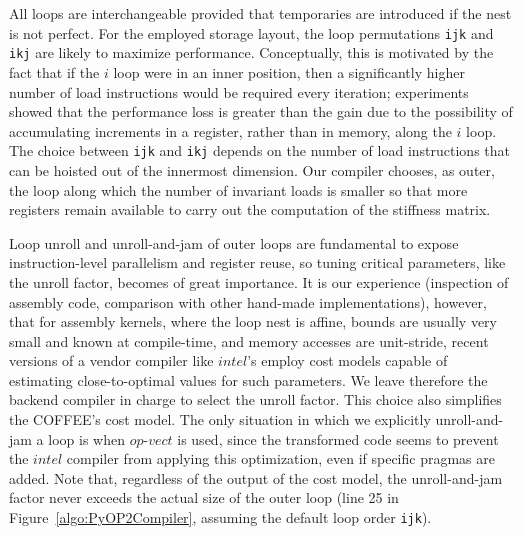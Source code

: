 \documentclass[conference]{IEEEtran}
\begin{document}
All loops are interchangeable provided that temporaries are introduced if the nest is not perfect. For the employed storage layout, the loop permutations \texttt{ijk} and \texttt{ikj} are likely to maximize performance. Conceptually, this is motivated by the fact that if the $i$ loop were in an inner position, then a significantly higher number of load instructions would be required every iteration; experiments showed that the performance loss is greater than the gain due to the possibility of accumulating increments in a register, rather than in memory, along the $i$ loop. The choice between \texttt{ijk} and \texttt{ikj} depends on the number of load instructions that can be hoisted out of the innermost dimension. Our compiler chooses, as outer, the loop along which the number of invariant loads is smaller so that more registers remain available to carry out the computation of the stiffness matrix.

Loop unroll and unroll-and-jam of outer loops are fundamental to expose instruction-level parallelism and register reuse, so tuning critical parameters, like the unroll factor, becomes of great importance. It is our experience (inspection of assembly code, comparison with other hand-made implementations), however, that for assembly kernels, where the loop nest is affine, bounds are usually very small and known at compile-time, and memory accesses are unit-stride, recent versions of a vendor compiler like $intel$'s employ cost models capable of estimating close-to-optimal values for such parameters. We leave therefore the backend compiler in charge to select the unroll factor. This choice also simplifies the COFFEE's cost model. The only situation in which we explicitly unroll-and-jam a loop is when $op$-$vect$ is used, since the transformed code seems to prevent the $intel$ compiler from applying this optimization, even if specific pragmas are added. Note that, regardless of the output of the cost model, the unroll-and-jam factor never exceeds the actual size of the outer loop (line 25 in Figure~\ref{algo:PyOP2Compiler}, assuming the default loop order \texttt{ijk}).
\end{document}
